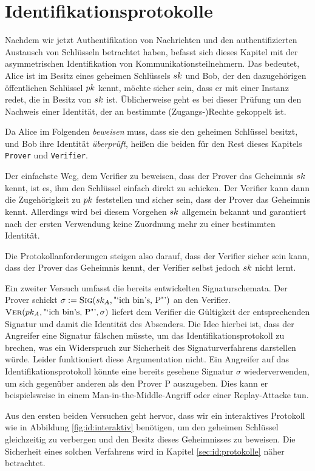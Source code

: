 \chapter{Identifikationsprotokolle} 
Nachdem wir jetzt Authentifikation von Nachrichten und den
authentifizierten Austausch von Schlüsseln betrachtet haben, befasst
sich dieses Kapitel mit der asymmetrischen Identifikation von
Kommunikationsteilnehmern. Das bedeutet, Alice ist im Besitz eines
geheimen Schlüssels $sk$ und Bob, der den dazugehörigen öffentlichen
Schlüssel $pk$ kennt, möchte sicher sein, dass er mit einer Instanz
redet, die in Besitz von $sk$ ist. Üblicherweise geht es bei dieser
Prüfung um den Nachweis einer Identität, der an bestimmte
(Zugangs-)Rechte gekoppelt ist.

Da Alice im Folgenden \emph{beweisen} muss, dass sie den geheimen
Schlüssel besitzt, und Bob ihre Identität \emph{überprüft}, heißen die
beiden für den Rest dieses Kapitels \texttt{Prover} und
\texttt{Verifier}\indexVerifier.

Der einfachste Weg, dem Verifier zu beweisen, dass der Prover das
Geheimnis $sk$ kennt, ist es, ihm den Schlüssel einfach direkt zu
schicken. Der Verifier kann dann die Zugehörigkeit zu $pk$
feststellen und sicher sein, dass der Prover das Geheimnis
kennt. Allerdings wird bei diesem Vorgehen $sk$ allgemein bekannt und
garantiert nach der ersten Verwendung keine Zuordnung mehr zu einer
bestimmten Identität.

Die Protokollanforderungen steigen also darauf, dass der Verifier sicher
sein kann, dass der Prover das Geheimnis kennt, der Verifier selbst
jedoch $sk$ nicht lernt.

Ein zweiter Versuch umfasst die bereits entwickelten
Signaturschemata. Der Prover schickt $\sigma := \textsc{Sig}(sk_A,
\text{"`ich bin's, P"'})$ an den Verifier.  $\textsc{Ver}(pk_A,\text{"`ich
bin's, P"'}, \sigma)$ liefert dem Verifier die Gültigkeit der
entsprechenden Signatur und damit die Identität des Absenders. Die Idee
hierbei ist, dass der Angreifer eine Signatur fälschen müsste, um das
Identifikationsprotokoll zu brechen, was ein Widerspruch zur Sicherheit
des Signaturverfahrens darstellen würde. Leider funktioniert diese
Argumentation nicht. Ein Angreifer auf das Identifikationsprotokoll
könnte eine bereits gesehene Signatur $\sigma$ wiederverwenden, um sich
gegenüber anderen als den Prover P auszugeben. Dies kann er
beispielsweise in einem Man-in-the-Middle-Angriff oder einer
Replay-Attacke tun.

Aus den ersten beiden Versuchen geht hervor, dass wir ein interaktives
Protokoll wie in Abbildung \ref{fig:id:interaktiv} benötigen, um den
geheimen Schlüssel gleichzeitig zu verbergen und den Besitz dieses
Geheimnisses zu beweisen. Die Sicherheit eines solchen Verfahrens wird
in Kapitel \ref{sec:id:protokolle} näher betrachtet.

